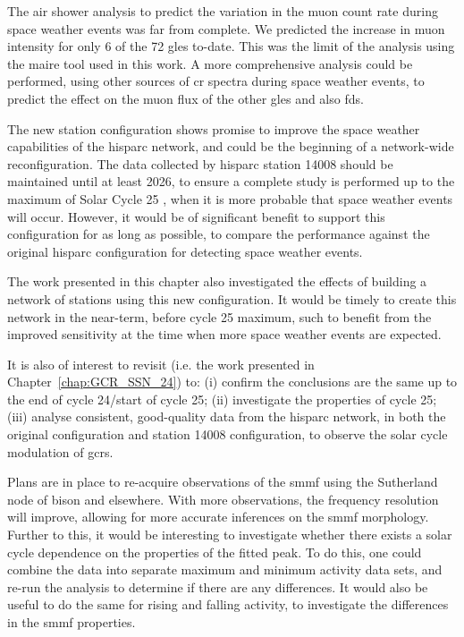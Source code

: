 The air shower analysis to predict the variation in the muon count rate during space weather events was far from complete. We predicted the increase in muon intensity for only 6 of the 72 \glspl{gle} to-date. This was the limit of the analysis using the \gls{maire} tool used in this work. A more comprehensive analysis could be performed, using other sources of \gls{cr} spectra during space weather events, to predict the effect on the muon flux of the other \glspl{gle} and also \glspl{fd}.

The new station configuration shows promise to improve the space weather capabilities of the \gls{hisparc} network, and could be the beginning of a network-wide reconfiguration. The data collected by \gls{hisparc} station 14008 should be maintained until at least 2026, to ensure a complete study is performed up to the maximum of Solar Cycle 25 \citep{mcintosh_overlapping_2020, pesnell_lessons_2020}, when it is more probable that space weather events will occur. However, it would be of significant benefit to support this configuration for as long as possible, to compare the performance against the original \gls{hisparc} configuration for detecting space weather events.

The work presented in this chapter also investigated the effects of building a network of stations using this new configuration. It would be timely to create this network in the near-term, before cycle 25 maximum, such to benefit from the improved sensitivity at the time when more space weather events are expected.


\vspace{2em}


It is also of interest to revisit \citet{ross_behaviour_2019} (i.e. the work presented in Chapter~\ref{chap:GCR_SSN_24}) to: (i) confirm the conclusions are the same up to the end of cycle 24/start of cycle 25; (ii) investigate the properties of cycle 25; (iii) analyse consistent, good-quality data from the \gls{hisparc} network, in both the original configuration and station 14008 configuration, to observe the solar cycle modulation of \glspl{gcr}.


\vspace{2em}


Plans are in place to re-acquire observations of the \gls{smmf} using the Sutherland node of \gls{bison} and elsewhere. With more observations, the frequency resolution will improve, allowing for more accurate inferences on the \gls{smmf} morphology. Further to this, it would be interesting to investigate whether there exists a solar cycle dependence on the properties of the fitted peak. To do this, one could combine the data into separate maximum and minimum activity data sets, and re-run the analysis to determine if there are any differences. It would also be useful to do the same for rising and falling activity, to investigate the differences in the \gls{smmf} properties.

